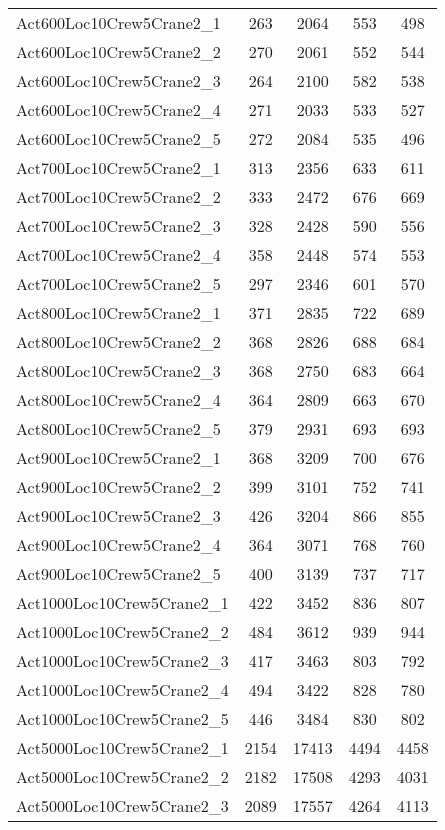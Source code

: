 {\begin{center}
\begin{longtable}{ | l | c | c | c | c | }
Act600Loc10Crew5Crane2\_1	&	263	&	2064	&	553	&	498	\\
Act600Loc10Crew5Crane2\_2	&	270	&	2061	&	552	&	544	\\
Act600Loc10Crew5Crane2\_3	&	264	&	2100	&	582	&	538	\\
Act600Loc10Crew5Crane2\_4	&	271	&	2033	&	533	&	527	\\
Act600Loc10Crew5Crane2\_5	&	272	&	2084	&	535	&	496	\\
Act700Loc10Crew5Crane2\_1	&	313	&	2356	&	633	&	611	\\
Act700Loc10Crew5Crane2\_2	&	333	&	2472	&	676	&	669	\\
Act700Loc10Crew5Crane2\_3	&	328	&	2428	&	590	&	556	\\
Act700Loc10Crew5Crane2\_4	&	358	&	2448	&	574	&	553	\\
Act700Loc10Crew5Crane2\_5	&	297	&	2346	&	601	&	570	\\
Act800Loc10Crew5Crane2\_1	&	371	&	2835	&	722	&	689	\\
Act800Loc10Crew5Crane2\_2	&	368	&	2826	&	688	&	684	\\
Act800Loc10Crew5Crane2\_3	&	368	&	2750	&	683	&	664	\\
Act800Loc10Crew5Crane2\_4	&	364	&	2809	&	663	&	670	\\
Act800Loc10Crew5Crane2\_5	&	379	&	2931	&	693	&	693	\\
Act900Loc10Crew5Crane2\_1	&	368	&	3209	&	700	&	676	\\
Act900Loc10Crew5Crane2\_2	&	399	&	3101	&	752	&	741	\\
Act900Loc10Crew5Crane2\_3	&	426	&	3204	&	866	&	855	\\
Act900Loc10Crew5Crane2\_4	&	364	&	3071	&	768	&	760	\\
Act900Loc10Crew5Crane2\_5	&	400	&	3139	&	737	&	717	\\
Act1000Loc10Crew5Crane2\_1	&	422	&	3452	&	836	&	807	\\
Act1000Loc10Crew5Crane2\_2	&	484	&	3612	&	939	&	944	\\
Act1000Loc10Crew5Crane2\_3	&	417	&	3463	&	803	&	792	\\
Act1000Loc10Crew5Crane2\_4	&	494	&	3422	&	828	&	780	\\
Act1000Loc10Crew5Crane2\_5	&	446	&	3484	&	830	&	802	\\
Act5000Loc10Crew5Crane2\_1	&	2154	&	17413	&	4494	&	4458	\\
Act5000Loc10Crew5Crane2\_2	&	2182	&	17508	&	4293	&	4031	\\
Act5000Loc10Crew5Crane2\_3	&	2089	&	17557	&	4264	&	4113	\\

\end{longtable}
\end{center}}
